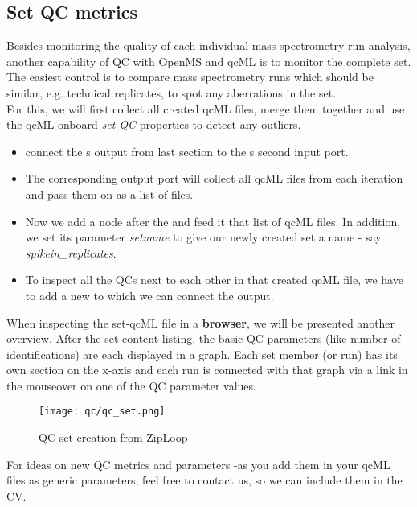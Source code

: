 \newpage
\subsection{Set QC metrics}
\label{Set QC metrics}

Besides monitoring the quality of each individual mass spectrometry run analysis, another capability of QC with OpenMS and qcML is to monitor the complete set. The easiest control is to compare mass spectrometry runs which should be similar, e.g. technical replicates, to spot any aberrations in the set.\\
For this, we will first collect all created qcML files, merge them together and use the qcML onboard \textit{set QC} properties to detect any outliers.

\begin{itemize}
\item connect the s output from last section to the s second input port. 
\item The corresponding output port will collect all qcML files from each  iteration and pass them on as a list of files.
\item Now we add a  node after the  and feed it that list of qcML files. In addition, we set its parameter \textit{setname} to give our newly created set a name - say \textit{spikein\_replicates}.
\item To inspect all the QCs next to each other in that created qcML file, we have to add a new  to which we can connect the  output.
\end{itemize}

When inspecting the set-qcML file in a \textbf{browser}, we will be presented another overview. After the set content listing, the basic QC parameters (like number of identifications) are each displayed in a graph. Each set member (or run) has its own section on the x-axis and each run is connected with that graph via a link in the mouseover on one of the QC parameter values.

\newpage

\begin{figure}[htbp]
  \centering
  \texttt{[image: qc/qc\_set.png]}
  \caption{QC set creation from ZipLoop}
  \label{fig:qc_set}
\end{figure}


\begin{task}
For ideas on new QC metrics and parameters -as you add them in your qcML files as generic parameters, feel free to contact us, so we can include them in the CV.
\end{task}

